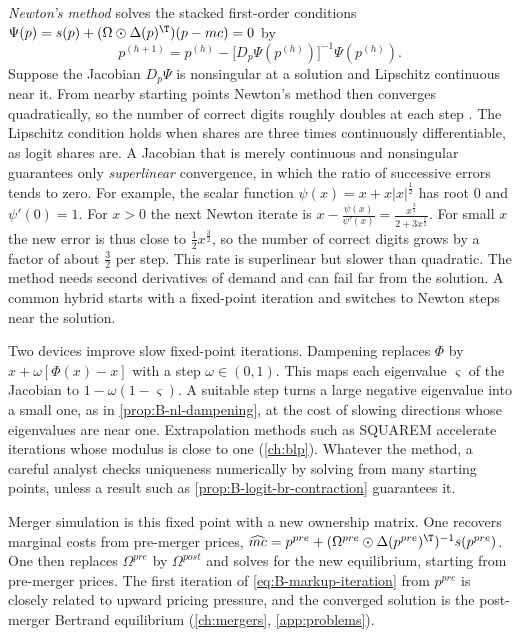 \emph{Newton's method} solves the stacked first-order conditions $\Psi(p) = s(p) + (\Omega \odot
\Delta(p)^\T)(p - mc) = 0$ by
\begin{equation*}
  p^{(h+1)} = p^{(h)} - \big[D_p\Psi(p^{(h)})\big]^{-1}\Psi(p^{(h)}).
\end{equation*}
Suppose the Jacobian $D_p\Psi$ is nonsingular at a solution and Lipschitz continuous near it. From nearby starting
points Newton's method then converges quadratically, so the number of correct digits roughly doubles at each step
\citep{Judd1998}. The Lipschitz condition holds when shares are three times continuously differentiable, as logit
shares are. A Jacobian that is merely continuous and nonsingular guarantees only \emph{superlinear} convergence, in
which the ratio of successive errors tends to zero. For example, the scalar function $\psi(x) = x +
x|x|^{\frac{1}{2}}$ has root $0$ and $\psi'(0) = 1$. For $x > 0$ the next Newton iterate is $x - \frac{\psi(x)}{\psi'(x)} =
\frac{x^{\frac{3}{2}}}{2 + 3x^{\frac{1}{2}}}$. For small $x$ the new error is thus close to $\frac{1}{2}x^{\frac{3}{2}}$, so
the number of correct digits grows by a factor of about $\frac{3}{2}$ per step. This rate is superlinear but slower
than quadratic. The method needs second derivatives of demand and can fail far from the solution. A common hybrid
starts with a fixed-point iteration and switches to Newton steps near the solution.

Two devices improve slow fixed-point iterations. Dampening replaces $\Phi$ by $x + \omega[\Phi(x) - x]$ with a
step $\omega \in (0, 1)$. This maps each eigenvalue $\varsigma$ of the Jacobian to $1 - \omega(1 - \varsigma)$. A
suitable step turns a large negative eigenvalue into a small one, as in \cref{prop:B-nl-dampening}, at the
cost of slowing directions whose eigenvalues are near one. Extrapolation methods such as SQUAREM \citep{VaradhanRoland2008} accelerate
iterations whose modulus is close to one (\cref{ch:blp}). Whatever the method, a careful analyst checks
uniqueness numerically by solving from many starting points, unless a result such as
\cref{prop:B-logit-br-contraction} guarantees it.

Merger simulation is this fixed point with a new ownership matrix. One recovers marginal costs from
pre-merger prices, $\widehat{mc} = p^{pre} + (\Omega^{pre} \odot \Delta(p^{pre})^\T)^{-1}s(p^{pre})$. One then
replaces $\Omega^{pre}$ by $\Omega^{post}$ and solves for the new equilibrium, starting from pre-merger
prices. The first iteration of \eqref{eq:B-markup-iteration} from $p^{pre}$ is closely related to upward
pricing pressure, and the converged solution is the post-merger Bertrand equilibrium (\cref{ch:mergers},
\cref{app:problems}).
